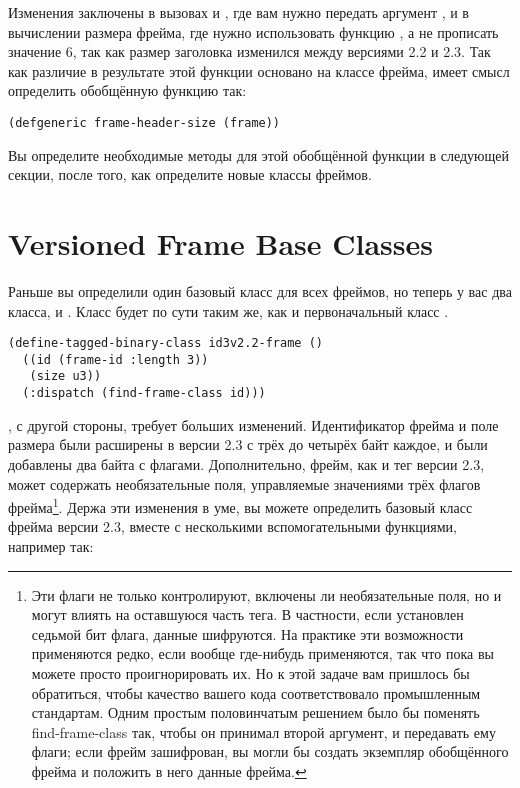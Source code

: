 Изменения заключены в вызовах  и , где вам нужно
передать аргумент , и в вычислении размера фрейма, где нужно использовать
функцию , а не прописать значение 6, так как размер заголовка
изменился между версиями 2.2 и 2.3. Так как различие в результате этой функции основано на
классе фрейма, имеет смысл определить обобщённую функцию так:

\begin{lstlisting}
(defgeneric frame-header-size (frame))
\end{lstlisting}

Вы определите необходимые методы для этой обобщённой функции в следующей секции, после
того, как определите новые классы фреймов.

\section{Versioned Frame Base Classes}

Раньше вы определили один базовый класс для всех фреймов, но теперь у вас два класса,
 и . Класс  будет по сути
таким же, как и первоначальный класс .

\begin{lstlisting}
(define-tagged-binary-class id3v2.2-frame ()
  ((id (frame-id :length 3))
   (size u3))
  (:dispatch (find-frame-class id)))
\end{lstlisting}

, с другой стороны, требует больших изменений. Идентификатор фрейма и
поле размера были расширены в версии 2.3 с трёх до четырёх байт каждое, и были добавлены
два байта с флагами. Дополнительно, фрейм, как и тег версии 2.3, может содержать
необязательные поля, управляемые значениями трёх флагов фрейма\footnote{Эти флаги не
  только контролируют, включены ли необязательные поля, но и могут влиять на оставшуюся
  часть тега. В частности, если установлен седьмой бит флага, данные шифруются. На
  практике эти возможности применяются редко, если вообще где-нибудь применяются, так что
  пока вы можете просто проигнорировать их. Но к этой задаче вам пришлось бы обратиться,
  чтобы качество вашего кода соответствовало промышленным стандартам. Одним простым
  половинчатым решением было бы поменять find-frame-class так, чтобы он принимал второй
  аргумент, и передавать ему флаги; если фрейм зашифрован, вы могли бы создать экземпляр
  обобщённого фрейма и положить в него данные фрейма.}. Держа эти изменения в уме, вы
можете определить базовый класс фрейма версии 2.3, вместе с несколькими вспомогательными
функциями, например так:

